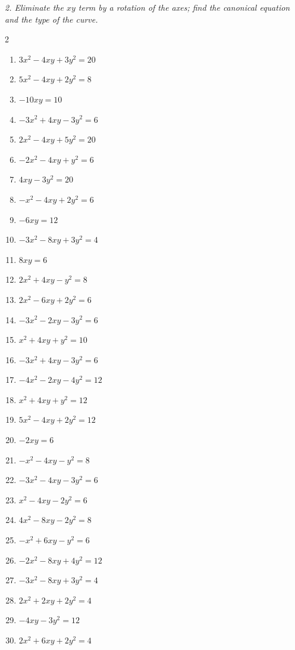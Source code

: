 \emph{2. Eliminate the $xy$ term by a rotation of the axes; find the canonical equation and the type of the curve.}
\bigskip
\begin{multicols}{2}\raggedright
\begin{enumerate}[label=\arabic*., leftmargin=*]
\item $3x^2-4xy+3y^2=20$
\item $5x^2-4xy+2y^2=8$
\item $-10xy=10$
\item $-3x^2+4xy-3y^2=6$
\item $2x^2-4xy+5y^2=20$
\item $-2x^2-4xy+y^2=6$
\item $4xy-3y^2=20$
\item $-x^2-4xy+2y^2=6$
\item $-6xy=12$
\item $-3x^2-8xy+3y^2=4$
\item $8xy=6$
\item $2x^2+4xy-y^2=8$
\item $2x^2-6xy+2y^2=6$
\item $-3x^2-2xy-3y^2=6$
\item $x^2+4xy+y^2=10$
\item $-3x^2+4xy-3y^2=6$
\item $-4x^2-2xy-4y^2=12$
\item $x^2+4xy+y^2=12$
\item $5x^2-4xy+2y^2=12$
\item $-2xy=6$
\item $-x^2-4xy-y^2=8$
\item $-3x^2-4xy-3y^2=6$
\item $x^2-4xy-2y^2=6$
\item $4x^2-8xy-2y^2=8$
\item $-x^2+6xy-y^2=6$
\item $-2x^2-8xy+4y^2=12$
\item $-3x^2-8xy+3y^2=4$
\item $2x^2+2xy+2y^2=4$
\item $-4xy-3y^2=12$
\item $2x^2+6xy+2y^2=4$
\end{enumerate}
\end{multicols}


